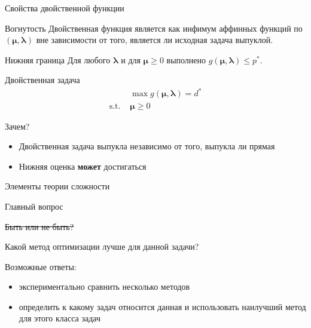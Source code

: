 \documentclass[12pt]{beamer}
\newcommand{\blambda}{\boldsymbol{\lambda}}
\newcommand{\bmu}{\boldsymbol{\mu}}
\begin{document}
\begin{frame}{Свойства двойственной функции}
\small
\vspace{-2mm}
\begin{block}{Вогнутость}
Двойственная функция является {\color{red}{вогнутой}} как инфимум аффинных функций по $(\bmu, \blambda)$ вне зависимости от того, является ли исходная задача выпуклой.
\end{block}

\begin{block}{Нижняя граница}
Для любого $\blambda$ и для $\bmu \geq 0$ выполнено $g(\bmu, \blambda) \leq p^*$.
\end{block}

\begin{block}{Двойственная задача}
\vspace{-5mm}
\begin{equation*}
\begin{split}
& \max g(\bmu, \blambda) = d^*\\
\text{s.t. } & \bmu \geq 0
\end{split}
\end{equation*}
\end{block}

\begin{block}{Зачем?}
\begin{itemize}
\vspace{-2mm}
\item Двойственная задача выпукла независимо от того, выпукла ли прямая
\vspace{-3mm}
\item Нижняя оценка \textbf{может} достигаться
\end{itemize}
\end{block}
\end{frame}


\begin{frame}{Элементы теории сложности}

\begin{block}{Главный вопрос}
\begin{center}
\sout{Быть или не быть?} 

Какой метод оптимизации лучше для данной задачи?
\end{center}
\end{block}

Возможные ответы:
\begin{itemize}
\item экспериментально сравнить несколько методов
\item определить к какому {\color{red}{классу}} задач относится данная и использовать наилучший метод для этого класса задач
\end{itemize}

\end{frame}
\end{document}
